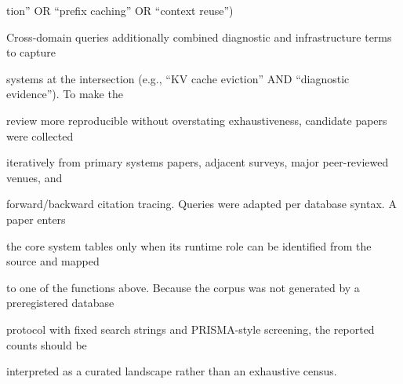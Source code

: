 \begin{flushleft}
\noindent  tion” OR “prefix caching” OR “context reuse”)\par
\noindent  Cross-domain queries additionally combined diagnostic and infrastructure terms to capture\par
\noindent systems at the intersection (e.g., “KV cache eviction” AND “diagnostic evidence”). To make the\par
\noindent review more reproducible without overstating exhaustiveness, candidate papers were collected\par
\noindent iteratively from primary systems papers, adjacent surveys, major peer-reviewed venues, and\par
\noindent forward/backward citation tracing. Queries were adapted per database syntax. A paper enters\par
\noindent the core system tables only when its runtime role can be identified from the source and mapped\par
\noindent to one of the functions above. Because the corpus was not generated by a preregistered database\par
\noindent protocol with fixed search strings and PRISMA-style screening, the reported counts should be\par
\noindent interpreted as a curated landscape rather than an exhaustive census.\par
\end{flushleft}

